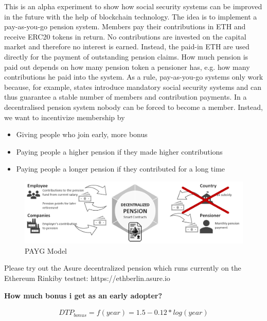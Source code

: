 This is an alpha experiment to show how social security systems can be improved in the future with the help of blockchain technology.
\newline\newline
The idea is to implement a pay-as-you-go pension system. Members pay their contributions in ETH and receive ERC20 tokens in return. No contributions are invested on the capital market and therefore no interest is earned. Instead, the paid-in ETH are used directly for the payment of outstanding pension claims. How much pension is paid out depends on how many pension token a pensioner has, e.g. how many contributions he paid into the system.
\newline\newline
As a rule, pay-as-you-go systems only work because, for example, states introduce mandatory social security systems and can thus guarantee a stable number of members and contribution payments. In a decentralised pension system nobody can be forced to become a member. Instead, we want to incentivize membership by

\begin{itemize}
\item Giving people who join early, more bonus
\item Paying people a higher pension if they made higher contributions
\item Paying people a longer pension if they contributed for a long time
\end{itemize}

\begin{figure}[H]
    \centering
    \includegraphics[width=5.0in]{pension.png}
    \caption{PAYG Model}
    \label{fig:payg}
\end{figure}

Please try out the Asure decentralized pension which runs currently on the Ethereum Rinkiby testnet: 
https://ethberlin.asure.io 
\newline\newline

\textbf{How much bonus i get as an early adopter?}

\begin{eqnarray}
	DTP_{bonus} = f(year) = 1.5-0.12 * log(year)
\end{eqnarray}

